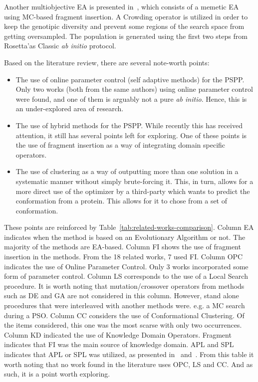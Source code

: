 Another multiobjective \ac{EA} is presented in~\cite{zaman2019balancing}, which
consists of a memetic EA using \ac{MC}-based fragment insertion. A Crowding operator
is utilized in order to keep the genotipic diversity and prevent some regions
of the search space from getting oversampled. The population is generated using
the first two steps from Rosetta'as Classic \textit{ab initio} protocol.

Based on the literature review, there are several note-worth points:
\begin{itemize}
    \item The use of online parameter control (self adaptive methods) for the PSPP.
    Only two works (both from the same authors) using online parameter control
    were found, and one of them is arguably not a pure \textit{ab initio}.
    Hence, this is an under-explored area of research.
    \item The use of hybrid methods for the PSPP. While recently this has received
    attention, it still has several points left for exploring. One of these points
    is the use of fragment insertion as a way of integrating domain specific operators.
    \item The use of clustering as a way of outputting more than one solution in a
    systematic manner without simply brute-forcing it. This, in turn, allows for
    a more direct use of the optimizer by a third-party which wants to predict the
    conformation from a protein. This allows for it to chose from a set of conformation.
\end{itemize}

These points are reinforced by Table~\ref{tab:related-works-comparison}. Column
\ac{EA} indicates when the method is based on an Evolutionary Algorithm or not. The majority of the methods are EA-based. Column \ac{FI} shows the use of fragment insertion
in the methods. From the 18 related works, 7 used \ac{FI}. Column OPC indicates
the use of Online Parameter Control. Only 3 works incorporated some form of
parameter control. Column LS corresponds to the use of a Local Search procedure.
It is worth noting that mutation/crossover operators from methods such as \ac{DE}
and \ac{GA} are not considered in this column. However, stand alone procedures that
were interleaved with another methods were. e.g. a \ac{MC} search during a \ac{PSO}.
Column \ac{CC} considers the use of Conformational Clustering. Of the items considered,
this one was the most scarse with only two occurrences. Column KD indicated the use
of Knowledge Domain Operators. Fragment indicates that \ac{FI} was the main
source of knowledge domain. APL and SPL indicates that APL or SPL was utilized,
as presented in~\cite{borguesan2015apl} and~\cite{oliveira2017sade}. From this
table it worth noting that no work found in the literature uses OPC, LS and CC.
And as such, it is a point worth exploring.

